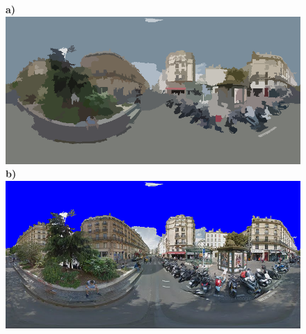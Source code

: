 \documentclass{article}
\begin{document}
\clearpage

\begin{figure}
\centering    
\textbf{\scriptsize{a)}}\includegraphics[scale=0.26]{Images/2/panorama-JtVHmEl7WCiz1xJ0bcJpBg-1_seg.png} 
\textbf{\scriptsize{b)}}\includegraphics[scale=0.26]{Images/2/panorama-JtVHmEl7WCiz1xJ0bcJpBg-1_ms_sky_mark.png} 
\end{figure} 

\clearpage
\end{document}

